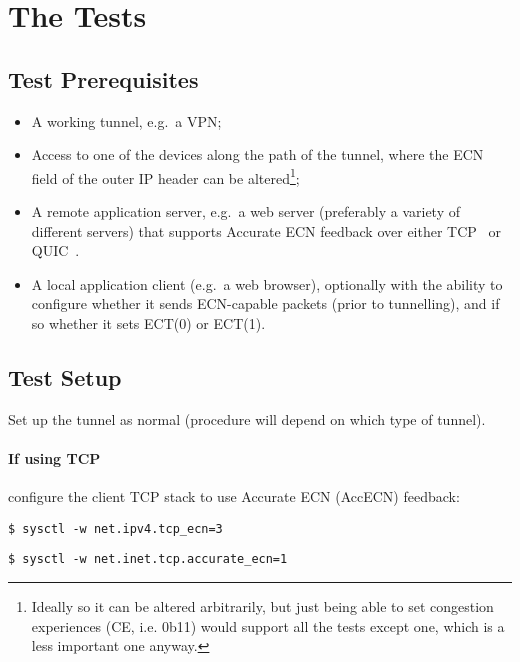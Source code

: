 \section{The Tests}\label{ecn-encap-test_Test}

\subsection{Test Prerequisites}\label{ecn-encap-test_Prereq}

\begin{itemize}[nosep]
	\item A working tunnel, e.g.\ a VPN;
	\item Access to one of the devices along the path of the tunnel, where the ECN
	field of the outer IP header can be altered\footnote{Ideally so it can be
	altered arbitrarily, but just being able to set congestion experiences (CE,
	i.e. 0b11) would support all the tests except one, which is a less important
	one anyway.};
	\item A remote application server, e.g.\ a web server (preferably a variety of
	different servers) that supports Accurate ECN feedback over either
	TCP~\cite{Briscoe14d:accecn_ID} or QUIC~\cite{Iyengar21:QUIC}.
	\item A local application client (e.g.\ a web browser), optionally with the
	ability to configure whether it sends ECN-capable packets (prior to
	tunnelling), and if so whether it sets ECT(0) or ECT(1).
\end{itemize}
\subsection{Test Setup}\label{ecn-encap-test_Setup}

Set up the tunnel as normal (procedure will depend on which type of tunnel).

\paragraph{If using TCP} configure the client TCP stack to use Accurate ECN (AccECN) feedback: 
\begin{description}[style=nextline, nosep]
	\item[Linux:] \texttt{\$ sysctl -w net.ipv4.tcp\_ecn=3}
	\item[MacOS:] \texttt{\$ sysctl -w net.inet.tcp.accurate\_ecn=1}
\end{description}

